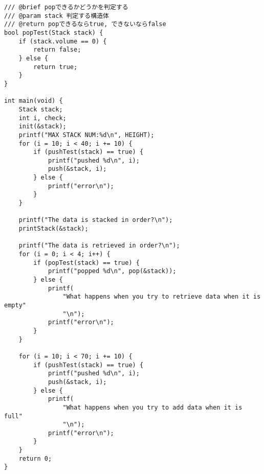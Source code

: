 \documentclass[a4j]{jarticle}
\begin{document}
\begin{lstlisting}[caption=スタックプログラム,label=stackcode]
/// @brief popできるかどうかを判定する
/// @param stack 判定する構造体
/// @return popできるならtrue, できないならfalse
bool popTest(Stack stack) {
    if (stack.volume == 0) {
        return false;
    } else {
        return true;
    }
}

int main(void) {
    Stack stack;
    int i, check;
    init(&stack);
    printf("MAX STACK NUM:%d\n", HEIGHT);
    for (i = 10; i < 40; i += 10) {
        if (pushTest(stack) == true) {
            printf("pushed %d\n", i);
            push(&stack, i);
        } else {
            printf("error\n");
        }
    }

    printf("The data is stacked in order?\n");
    printStack(&stack);

    printf("The data is retrieved in order?\n");
    for (i = 0; i < 4; i++) {
        if (popTest(stack) == true) {
            printf("popped %d\n", pop(&stack));
        } else {
            printf(
                "What happens when you try to retrieve data when it is empty"
                "\n");
            printf("error\n");
        }
    }

    for (i = 10; i < 70; i += 10) {
        if (pushTest(stack) == true) {
            printf("pushed %d\n", i);
            push(&stack, i);
        } else {
            printf(
                "What happens when you try to add data when it is full"
                "\n");
            printf("error\n");
        }
    }
    return 0;
}
\end{lstlisting}
\end{document}
